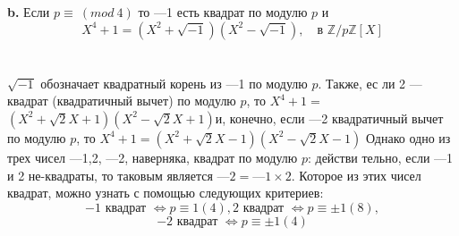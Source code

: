 \documentclass{mai_book}
\begin{document}
\hspace*{15pt}\textbf{b.} Если $p \equiv ~(mod~ 4)$ то —1 есть квадрат по модулю $p$ и
$$X^{4} + 1 = (X^{2} + \sqrt{-1})(X^{2} - \sqrt{-1}),\quad\text{в }\mathbb{Z}/p\mathbb{Z}[X]$$\\
\\
$\sqrt{-1}$ обозначает квадратный корень из —1 по модулю $p$. Также, ес­\linebreak
ли 2 --- квадрат (квадратичный вычет) по модулю $p$, то $X^{4} + 1 = $\linebreak
$(X^{2} + \sqrt{2}X + 1)(X^{2} - \sqrt{2}X + 1)$и, конечно, если —2 квадратичный вычет\linebreak
по модулю $p$, то $X^{4} + 1 = (X^{2} + \sqrt{2}X - 1)(X^{2} - \sqrt{2}X - 1)$ Однако\linebreak
одно из трех чисел —1,2, —2, наверняка, квадрат по модулю $p$: действи­\linebreak
тельно, если —1 и 2 не-квадраты, то таковым является $—2 = —1 \times 2.$\linebreak
Которое из этих чисел квадрат, можно узнать с помощью следующих\linebreak
критериев:
$$-1\text{ квадрат }\Leftrightarrow p \equiv 1 (4), 2\text{ квадрат } \Leftrightarrow p \equiv \pm 1 (8),$$
$$-2\text{ квадрат }\Leftrightarrow p \equiv \pm 1 (4)$$
\end{document}

